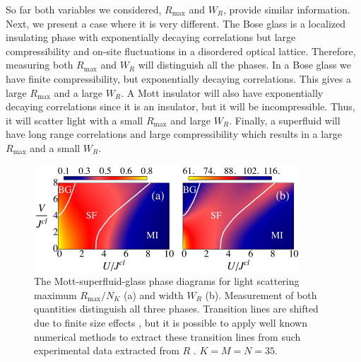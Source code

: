 So far both variables we considered, $R_\text{max}$ and $W_R$, provide
similar information. Next, we present a case where it is very
different. The Bose glass is a localized insulating phase with
exponentially decaying correlations but large compressibility and
on-site fluctuations in a disordered optical lattice. Therefore,
measuring both $R_\text{max}$ and $W_R$ will distinguish all the
phases. In a Bose glass we have finite compressibility, but
exponentially decaying correlations. This gives a large $R_\text{max}$
and a large $W_R$. A Mott insulator will also have exponentially
decaying correlations since it is an insulator, but it will be
incompressible. Thus, it will scatter light with a small
$R_\text{max}$ and large $W_R$. Finally, a superfluid will have long
range correlations and large compressibility which results in a large
$R_\text{max}$ and a small $W_R$.

\begin{figure}[htbp!]  
  \centering
  \includegraphics[width=\linewidth]{oph22}
  \caption[Mapping the Disoredered Phase Diagram]{The
    Mott-superfluid-glass phase diagrams for light scattering maximum
    $R_\text{max}/N_K$ (a) and width $W_R$ (b). Measurement of both
    quantities distinguish all three phases. Transition lines are
    shifted due to finite size effects \cite{roux2008}, but it is
    possible to apply well known numerical methods to extract these
    transition lines from such experimental data extracted from $R$
    \cite{ejima2011}. $K=M=N=35$.}
  \label{fig:BG}
\end{figure}

